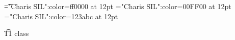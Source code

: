 \documentclass[a4paper]{article}
\begin{document}
\pagestyle{plain}
\sloppy
\setlength{\parfillskip}{0pt plus 1fil}
\font\t="Charis SIL":color=ff0000 at 12pt
\font\zt="Charis SIL":color=00FF00 at 12pt
\font\wzt="Charis SIL":color=123abc at 12pt

\pagestyle{fancy} 

\t{T1 class }


\end{document}

